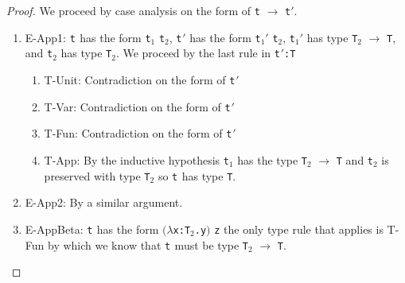 \documentclass{article}
\newcommand{\term}[1]{{\tt t$_{#1}$}}
\begin{document}
\begin{enumerate}
\begin{enumerate}
           \begin{proof}
             We proceed by case analysis on the form of \verb|t| $\longrightarrow$ \verb|t|$'$.
             \begin{enumerate}
             \item E-App1: \term{} has the form \term{1} \term{2}, \term{}$'$ has the form \term{1}$'$ \term{2}, \term{1}$'$ has type \verb|T|$_2$ $\rightarrow$ \verb|T|, and \term{2} has type \verb|T|$_2$. We proceed by the last rule in \term{}$'$\verb|:T|
               \begin{enumerate}
                 \item T-Unit: Contradiction on the form of \term{}$'$
                 \item T-Var: Contradiction on the form of \term{}$'$
                 \item T-Fun: Contradiction on the form of \term{}$'$
                 \item T-App: By the inductive hypothesis \term{1} has the type \verb|T|$_2$ $\rightarrow$ \verb|T| and \term{2} is preserved with type \verb|T|$_2$ so \term{} has type \verb|T|.
               \end{enumerate}
             \item E-App2: By a similar argument.
             \item E-AppBeta: \term{} has the form $(\lambda$\verb|x:T|$_2$\verb|.y|$)$ \verb|z| the only type rule that applies is T-Fun by which we know that \term{} must be type \verb|T|$_2$ $\rightarrow$ \verb|T|.
             \end{enumerate}
           \end{proof}

       \end{enumerate}
     \end{enumerate}
\end{document}
